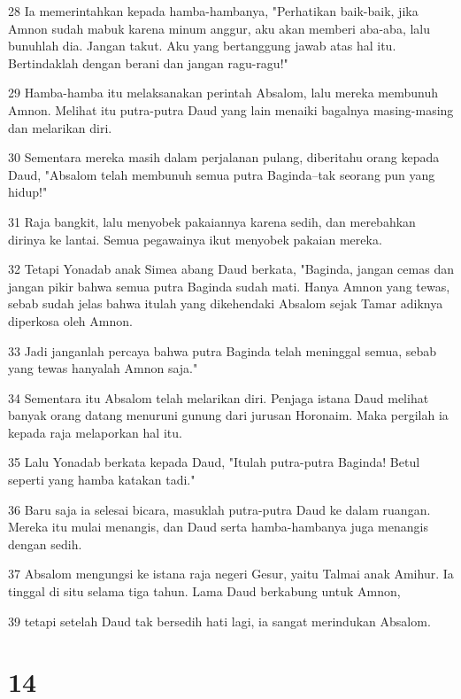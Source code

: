 \par 28 Ia memerintahkan kepada hamba-hambanya, "Perhatikan baik-baik, jika Amnon sudah mabuk karena minum anggur, aku akan memberi aba-aba, lalu bunuhlah dia. Jangan takut. Aku yang bertanggung jawab atas hal itu. Bertindaklah dengan berani dan jangan ragu-ragu!"
\par 29 Hamba-hamba itu melaksanakan perintah Absalom, lalu mereka membunuh Amnon. Melihat itu putra-putra Daud yang lain menaiki bagalnya masing-masing dan melarikan diri.
\par 30 Sementara mereka masih dalam perjalanan pulang, diberitahu orang kepada Daud, "Absalom telah membunuh semua putra Baginda--tak seorang pun yang hidup!"
\par 31 Raja bangkit, lalu menyobek pakaiannya karena sedih, dan merebahkan dirinya ke lantai. Semua pegawainya ikut menyobek pakaian mereka.
\par 32 Tetapi Yonadab anak Simea abang Daud berkata, "Baginda, jangan cemas dan jangan pikir bahwa semua putra Baginda sudah mati. Hanya Amnon yang tewas, sebab sudah jelas bahwa itulah yang dikehendaki Absalom sejak Tamar adiknya diperkosa oleh Amnon.
\par 33 Jadi janganlah percaya bahwa putra Baginda telah meninggal semua, sebab yang tewas hanyalah Amnon saja."
\par 34 Sementara itu Absalom telah melarikan diri. Penjaga istana Daud melihat banyak orang datang menuruni gunung dari jurusan Horonaim. Maka pergilah ia kepada raja melaporkan hal itu.
\par 35 Lalu Yonadab berkata kepada Daud, "Itulah putra-putra Baginda! Betul seperti yang hamba katakan tadi."
\par 36 Baru saja ia selesai bicara, masuklah putra-putra Daud ke dalam ruangan. Mereka itu mulai menangis, dan Daud serta hamba-hambanya juga menangis dengan sedih.
\par 37 Absalom mengungsi ke istana raja negeri Gesur, yaitu Talmai anak Amihur. Ia tinggal di situ selama tiga tahun. Lama Daud berkabung untuk Amnon,
\par 39 tetapi setelah Daud tak bersedih hati lagi, ia sangat merindukan Absalom.

\chapter{14}

